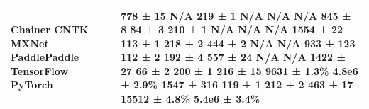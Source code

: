 \begin{tabular}{ll}
\toprule
Chainer CNTK MXNet PaddlePaddle TensorFlow PyTorch & 778 ± 15 N/A 219 ± 1 N/A N/A N/A 845 ± 8 84 ± 3 210 ± 1 N/A N/A N/A 1554 ± 22 113 ± 1 218 ± 2 444 ± 2 N/A N/A 933 ± 123 112 ± 2 192 ± 4 557 ± 24 N/A N/A 1422 ± 27 66 ± 2 200 ± 1 216 ± 15 9631 ± 1.3\% 4.8e6 ± 2.9\% 1547 ± 316 119 ± 1 212 ± 2 463 ± 17 15512 ± 4.8\% 5.4e6 ± 3.4\% \\
\midrule
\bottomrule
\end{tabular}
